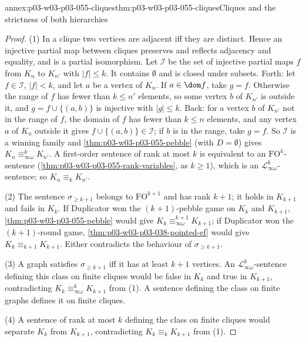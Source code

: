 \begin{annexitem}{annex:p03-w03-p03-055-cliques}{thm:p03-w03-p03-055-cliques}{Cliques and the strictness of both hierarchies}
\begin{proof}
(1) In a clique two vertices are adjacent iff they are distinct. Hence an
injective partial map between cliques preserves and reflects adjacency and
equality, and is a partial isomorphism. Let \(\mathcal I\) be the set of
injective partial maps \(f\) from \(K_n\) to \(K_{n'}\) with \(|f|\le k\).
It contains \(\emptyset\) and is closed under subsets. Forth: let
\(f\in\mathcal I\), \(|f|<k\), and let \(a\) be a vertex of \(K_n\). If
\(a\in\dom f\), take \(g=f\). Otherwise the range of \(f\) has fewer than
\(k\le n'\) elements, so some vertex \(b\) of \(K_{n'}\) is outside it, and
\(g=f\cup\{(a,b)\}\) is injective with \(|g|\le k\). Back: for a vertex
\(b\) of \(K_{n'}\) not in the range of \(f\), the domain of \(f\) has fewer
than \(k\le n\) elements, and any vertex \(a\) of \(K_n\) outside it gives
\(f\cup\{(a,b)\}\in\mathcal I\); if \(b\) is in the range, take \(g=f\).
So \(\mathcal I\) is a winning family and
\cref{thm:p03-w03-p03-055-pebble} (with \(D=\emptyset\)) gives
\(K_n\equiv^k_{\infty\omega}K_{n'}\). A first-order sentence of rank at most
\(k\) is equivalent to an \(\mathrm{FO}^k\)-sentence
(\cref{thm:p03-w03-p03-055-rank-variables}, as \(k\ge1\)), which is an
\(\mathcal L^k_{\infty\omega}\)-sentence; so \(K_n\equiv_kK_{n'}\).

(2) The sentence \(\sigma_{\ge k+1}\) belongs to \(\mathrm{FO}^{k+1}\) and
has rank \(k+1\); it holds in \(K_{k+1}\) and fails in \(K_k\). If
Duplicator won the \((k+1)\)-pebble game on \(K_k\) and \(K_{k+1}\),
\cref{thm:p03-w03-p03-055-pebble} would give
\(K_k\equiv^{k+1}_{\infty\omega}K_{k+1}\); if Duplicator won the
\((k+1)\)-round game, \cref{thm:p03-w03-p03-038-pointed-ef} would give
\(K_k\equiv_{k+1}K_{k+1}\). Either contradicts the behaviour of
\(\sigma_{\ge k+1}\).

(3) A graph satisfies \(\sigma_{\ge k+1}\) iff it has at least \(k+1\)
vertices. An \(\mathcal L^k_{\infty\omega}\)-sentence defining this class on
finite cliques would be false in \(K_k\) and true in \(K_{k+1}\),
contradicting \(K_k\equiv^k_{\infty\omega}K_{k+1}\) from (1). A sentence
defining the class on finite graphs defines it on finite cliques.

(4) A sentence of rank at most \(k\) defining the class on finite cliques
would separate \(K_k\) from \(K_{k+1}\), contradicting
\(K_k\equiv_kK_{k+1}\) from (1).
\end{proof}
\end{annexitem}


